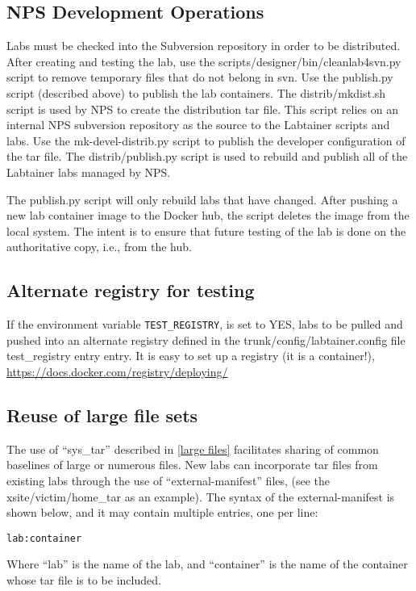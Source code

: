 \documentclass[12pt]{article}
\begin{document}
\subsection{NPS Development Operations}
Labs must be checked into the Subversion repository in order to be distributed.  After creating and testing
the lab, use the scripts/designer/bin/cleanlab4svn.py script to remove temporary files that do not belong in 
svn.  Use the publish.py script (described above) to publish the lab containers.
The distrib/mkdist.sh script is used by NPS to create the distribution tar file.  This script relies on
an internal NPS subversion repository as the source to the Labtainer scripts and labs.  Use the mk-devel-distrib.py script
to publish the developer configuration of the tar file.  The distrib/publish.py script is used to rebuild and 
publish all of the Labtainer labs managed by NPS.

The publish.py script will only rebuild labs that have changed.  After pushing a new lab container
image to the Docker hub, the script deletes the image from the local system.  The intent is to
ensure that future testing of the lab is done on the authoritative copy, i.e., from the hub.

\subsection{Alternate registry for testing}
If the environment variable {\tt TEST\_REGISTRY}, is set to YES, labs to be pulled and pushed
into an alternate registry defined in the trunk/config/labtainer.config file test\_registry entry entry.
It is easy to set up a registry (it is a container!), \url{https://docs.docker.com/registry/deploying/}


\subsection{Reuse of large file sets}
\label{manifest}
The use of ``sys\_tar'' described in \ref{large files} facilitates sharing of common
baselines of large or numerous files.  New labs can incorporate tar files from existing
labs through the use of ``external-manifest'' files, (see the xsite/victim/home\_tar as
an example).   The syntax of the external-manifest is shown below, and it may contain
multiple entries, one per line:
\begin{verbatim}
lab:container
\end{verbatim}
\noindent Where ``lab'' is the name of the lab, and ``container'' is the name of the container
whose tar file is to be included.
\end{document}
